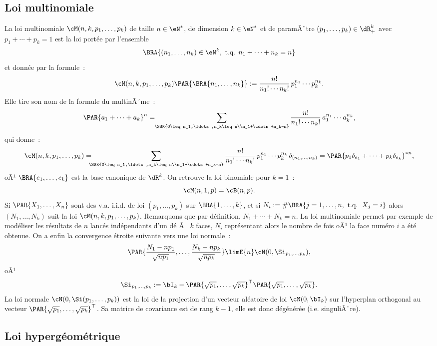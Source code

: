 {{%
\subsection{Loi multinomiale}\label{ss:loi:multinomiale}
%

La loi multinomiale $\cM(n,k,p_1,\ldots,p_k)$ de taille $n\in\eN^*$, de dimension
$k\in\eN^*$ et de paramÃ¨tre $(p_1,\ldots,p_k)\in\dR_+^k$ 
avec $p_1+\cdots+p_k=1$ est la loi portée par l'ensemble
$$
\BRA{(n_1,\ldots,n_k) \in \eN^k, \text{ t.q. } n_1+\cdots+n_k=n}
$$
et donnée par la formule~:
$$
\cM(n,k,p_1,\ldots,p_k)\PAR{\BRA{n_1,\ldots,n_k}}
:=\frac{n!}{n_1!\cdots n_k!}\,p_1^{n_1}\cdots p_k^{n_k}.
$$
Elle tire son nom de la formule du multinÃ´me~: 
$$
\PAR{a_1+\cdots+a_k}^n=
\!\!\sum_{\SSK{0\leq n_1,\ldots,n_k\leq n\\n_1+\cdots+n_k=n}} 
\frac{n!}{n_1!\cdots n_k!}\,a_1^{n_1}\cdots a_k^{n_k}, 
$$
qui donne~:
$$
\cM(n,k,p_1,\ldots,p_k) = 
\!\!\!\!\sum_{\SSK{0\leq n_1,\ldots,n_k\leq n\\n_1+\cdots+n_k=n}} 
\frac{n!}{n_1!\cdots n_k!}\,p_1^{n_1}\cdots p_k^{n_k} 
\,\delta_{(n_1,\ldots,n_k)} = \PAR{p_1\delta_{e_1}+\cdots+p_k\delta_{e_k}}^{*n},
$$
oÃ¹ $\BRA{e_1,\ldots,e_k}$ est la base canonique de $\dR^k$.
On retrouve la loi binomiale pour $k=1$~: 
$$
\cM(n,1,p)=\cB(n,p).
$$
Si $\PAR{X_1,\ldots,X_n}$ sont des v.a. i.i.d. de loi $(p_1,\ldots,p_k)$ sur 
$\BRA{1,\ldots,k}$, et si 
$N_i:=\#\BRA{j=1,\ldots,n,\text{ t.q. }\, X_j=i}$ 
alors $(N_1,\ldots,N_k)$ suit la loi $\cM(n,k,p_1,\ldots,p_k)$. 
Remarquons que par définition, $N_1+\cdots+N_k=n$. La loi
multinomiale permet par exemple de modéliser les résultats de $n$ lancés
indépendants d'un dé Ã  $k$ faces, $N_i$ représentant alors le nombre de fois
oÃ¹ la face numéro $i$ a été obtenue. On a enfin la convergence étroite
suivante vers une loi normale~:
$$
\PAR{\frac{N_1-np_1}{\sqrt{np_1}},\ldots,\frac{N_k-np_k}{\sqrt{np_k}}}
\limE{n} \cN(0,\Si_{p_1,\ldots,p_k}),
$$
oÃ¹ 
$$
\Si_{p_1,\ldots,p_k}:=\bI_k-\PAR{\sqrt{p_1},\ldots,\sqrt{p_k}}^\top\PAR{\sqrt{p_1},\ldots,\sqrt{p_k}}.
$$
La loi normale $\cN(0,\Si(p_1,\ldots,p_k))$ est la loi de la projection d'un
vecteur aléatoire de loi $\cN(0,\bI_k)$ sur l'hyperplan orthogonal au vecteur
$\PAR{\sqrt{p_1},\ldots,\sqrt{p_k}}^\top$. Sa matrice de covariance est de rang $k-1$,
elle est donc dégénérée (i.e. singuliÃ¨re).

%
\subsection{Loi hypergéométrique}\label{loi:hypergeom}
%

}}
